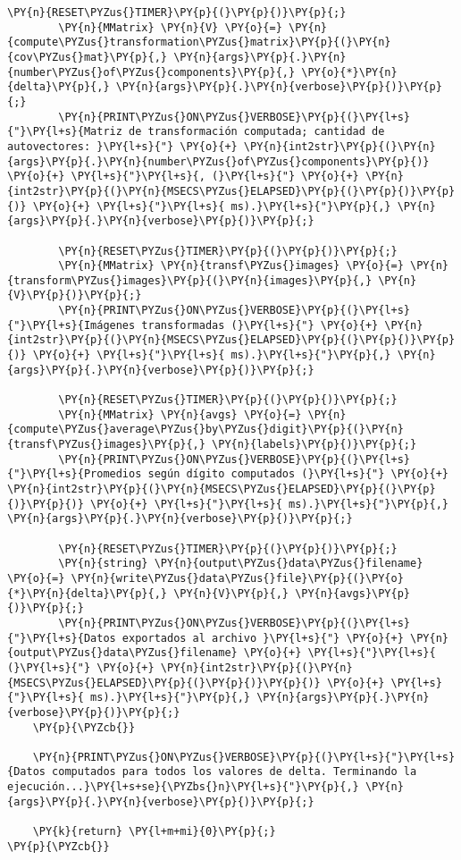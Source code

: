 \begin{Verbatim}[commandchars=\\\{\}]
		\PY{n}{RESET\PYZus{}TIMER}\PY{p}{(}\PY{p}{)}\PY{p}{;}
	 	\PY{n}{MMatrix} \PY{n}{V} \PY{o}{=} \PY{n}{compute\PYZus{}transformation\PYZus{}matrix}\PY{p}{(}\PY{n}{cov\PYZus{}mat}\PY{p}{,} \PY{n}{args}\PY{p}{.}\PY{n}{number\PYZus{}of\PYZus{}components}\PY{p}{,} \PY{o}{*}\PY{n}{delta}\PY{p}{,} \PY{n}{args}\PY{p}{.}\PY{n}{verbose}\PY{p}{)}\PY{p}{;}
		\PY{n}{PRINT\PYZus{}ON\PYZus{}VERBOSE}\PY{p}{(}\PY{l+s}{"}\PY{l+s}{Matriz de transformación computada; cantidad de autovectores: }\PY{l+s}{"} \PY{o}{+} \PY{n}{int2str}\PY{p}{(}\PY{n}{args}\PY{p}{.}\PY{n}{number\PYZus{}of\PYZus{}components}\PY{p}{)} \PY{o}{+} \PY{l+s}{"}\PY{l+s}{, (}\PY{l+s}{"} \PY{o}{+} \PY{n}{int2str}\PY{p}{(}\PY{n}{MSECS\PYZus{}ELAPSED}\PY{p}{(}\PY{p}{)}\PY{p}{)} \PY{o}{+} \PY{l+s}{"}\PY{l+s}{ ms).}\PY{l+s}{"}\PY{p}{,} \PY{n}{args}\PY{p}{.}\PY{n}{verbose}\PY{p}{)}\PY{p}{;}

		\PY{n}{RESET\PYZus{}TIMER}\PY{p}{(}\PY{p}{)}\PY{p}{;}
	 	\PY{n}{MMatrix} \PY{n}{transf\PYZus{}images} \PY{o}{=} \PY{n}{transform\PYZus{}images}\PY{p}{(}\PY{n}{images}\PY{p}{,} \PY{n}{V}\PY{p}{)}\PY{p}{;}
	 	\PY{n}{PRINT\PYZus{}ON\PYZus{}VERBOSE}\PY{p}{(}\PY{l+s}{"}\PY{l+s}{Imágenes transformadas (}\PY{l+s}{"} \PY{o}{+} \PY{n}{int2str}\PY{p}{(}\PY{n}{MSECS\PYZus{}ELAPSED}\PY{p}{(}\PY{p}{)}\PY{p}{)} \PY{o}{+} \PY{l+s}{"}\PY{l+s}{ ms).}\PY{l+s}{"}\PY{p}{,} \PY{n}{args}\PY{p}{.}\PY{n}{verbose}\PY{p}{)}\PY{p}{;}
		
		\PY{n}{RESET\PYZus{}TIMER}\PY{p}{(}\PY{p}{)}\PY{p}{;}
	 	\PY{n}{MMatrix} \PY{n}{avgs} \PY{o}{=} \PY{n}{compute\PYZus{}average\PYZus{}by\PYZus{}digit}\PY{p}{(}\PY{n}{transf\PYZus{}images}\PY{p}{,} \PY{n}{labels}\PY{p}{)}\PY{p}{;}
	 	\PY{n}{PRINT\PYZus{}ON\PYZus{}VERBOSE}\PY{p}{(}\PY{l+s}{"}\PY{l+s}{Promedios según dígito computados (}\PY{l+s}{"} \PY{o}{+} \PY{n}{int2str}\PY{p}{(}\PY{n}{MSECS\PYZus{}ELAPSED}\PY{p}{(}\PY{p}{)}\PY{p}{)} \PY{o}{+} \PY{l+s}{"}\PY{l+s}{ ms).}\PY{l+s}{"}\PY{p}{,} \PY{n}{args}\PY{p}{.}\PY{n}{verbose}\PY{p}{)}\PY{p}{;}

	 	\PY{n}{RESET\PYZus{}TIMER}\PY{p}{(}\PY{p}{)}\PY{p}{;}
	 	\PY{n}{string} \PY{n}{output\PYZus{}data\PYZus{}filename} \PY{o}{=} \PY{n}{write\PYZus{}data\PYZus{}file}\PY{p}{(}\PY{o}{*}\PY{n}{delta}\PY{p}{,} \PY{n}{V}\PY{p}{,} \PY{n}{avgs}\PY{p}{)}\PY{p}{;}
	 	\PY{n}{PRINT\PYZus{}ON\PYZus{}VERBOSE}\PY{p}{(}\PY{l+s}{"}\PY{l+s}{Datos exportados al archivo }\PY{l+s}{"} \PY{o}{+} \PY{n}{output\PYZus{}data\PYZus{}filename} \PY{o}{+} \PY{l+s}{"}\PY{l+s}{ (}\PY{l+s}{"} \PY{o}{+} \PY{n}{int2str}\PY{p}{(}\PY{n}{MSECS\PYZus{}ELAPSED}\PY{p}{(}\PY{p}{)}\PY{p}{)} \PY{o}{+} \PY{l+s}{"}\PY{l+s}{ ms).}\PY{l+s}{"}\PY{p}{,} \PY{n}{args}\PY{p}{.}\PY{n}{verbose}\PY{p}{)}\PY{p}{;}
	\PY{p}{\PYZcb{}}

	\PY{n}{PRINT\PYZus{}ON\PYZus{}VERBOSE}\PY{p}{(}\PY{l+s}{"}\PY{l+s}{Datos computados para todos los valores de delta. Terminando la ejecución...}\PY{l+s+se}{\PYZbs{}n}\PY{l+s}{"}\PY{p}{,} \PY{n}{args}\PY{p}{.}\PY{n}{verbose}\PY{p}{)}\PY{p}{;}

	\PY{k}{return} \PY{l+m+mi}{0}\PY{p}{;}
\PY{p}{\PYZcb{}}
\end{Verbatim}
